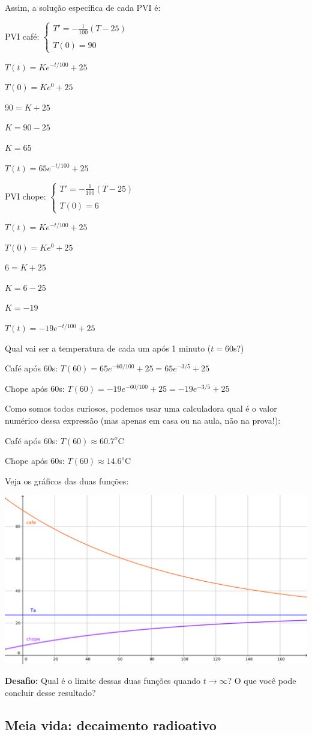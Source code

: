 \documentclass[a4paper]{article}
\begin{document}
Assim, a solução específica de cada PVI é:

\begin{multicols}{2}
PVI café:  $\left\{
    \begin{array}{l}
      T'=-\frac{1}{100}(T-25)\\
      \\
      T(0)=90
    \end{array}
  \right.$

$T(t)=Ke^{-t/100}+25$

$T(0)=Ke^{0}+25$

$90=K+25$

$K= 90 - 25$

$K=65$

$T(t)=65e^{-t/100}+25$

\columnbreak

PVI chope:  $\left\{
    \begin{array}{l}
      T'=-\frac{1}{100}(T-25)\\
      \\
      T(0)=6
    \end{array}
  \right.$

$T(t)=Ke^{-t/100}+25$

$T(0)=Ke^{0}+25$

$6=K+25$

$K= 6 - 25$

$K=-19$

$T(t)=-19e^{-t/100}+25$

\end{multicols}

Qual vai ser a temperatura de cada um após 1 minuto ($t=60$s?)

Café após $60$s: $T(60)=65e^{-60/100}+25 = 65e^{-3/5}+25$

Chope após $60$s: $T(60)=-19e^{-60/100}+25 = -19e^{-3/5}+25$

Como somos todos curiosos, podemos usar uma calculadora qual é o valor numérico dessa
expressão (mas apenas em casa ou na aula, não na prova!):

Café após $60$s: $T(60)\approx 60.7^o$C

Chope após $60$s: $T(60)\approx 14.6^o$C

Veja os gráficos das duas funções:

\begin{center}
  \includegraphics[width=.9\textwidth]{cafe_chope}
\end{center}
\hrulefill

{\bf Desafio:} Qual é o limite dessas duas funções quando
$t\rightarrow \infty$? O que você pode concluir desse resultado?

\subsection{Meia vida: decaimento radioativo}
\end{document}
